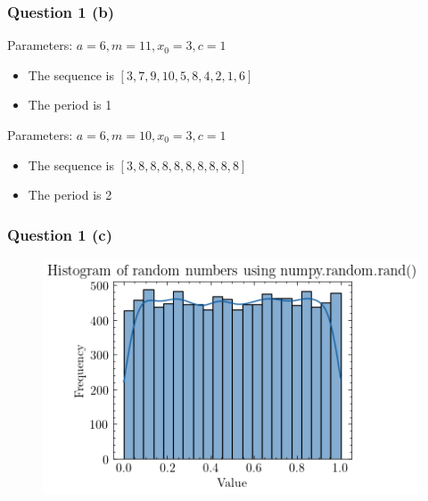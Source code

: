 \documentclass[compress,12pt]{beamer}
\begin{document}
\begin{frame}
      \frametitle{Question 1 (b)}

      Parameters: $a = 6, m = 11, x_0 = 3, c = 1$
      \begin{itemize}
            \item The sequence is $[3, 7, 9, 10, 5, 8, 4, 2, 1, 6]$
            \item The period is 1
      \end{itemize}

      Parameters: $a = 6, m = 10, x_0 = 3, c = 1$
      \begin{itemize}
            \item The sequence is $[3, 8, 8, 8, 8, 8, 8, 8, 8, 8]$
            \item The period is 2
      \end{itemize}

\end{frame}

\begin{frame}
      \frametitle{Question 1 (c)}
      \begin{figure}
            \centering
            \includegraphics[scale=0.7]{imgs/1d.png}
      \end{figure}
\end{frame}
\end{document}
